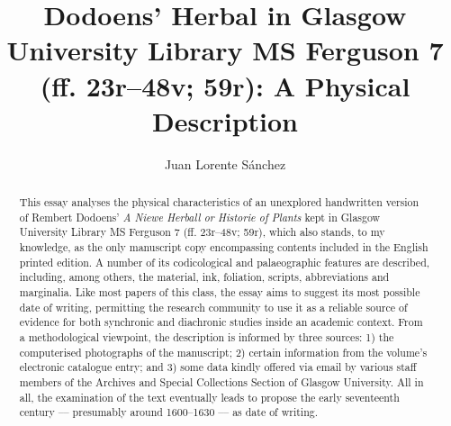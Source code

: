 \documentclass{article}
\author{Juan Lorente Sánchez}
\title{Dodoens' Herbal in Glasgow University Library MS Ferguson 7 (ff.
23r--48v; 59r): A Physical Description}
\begin{document}
\maketitle

\begin{abstract}
This essay analyses the physical characteristics of an unexplored handwritten version of Rembert Dodoens' \emph{A Niewe Herball or Historie of Plants} kept in Glasgow University Library MS Ferguson 7 (ff. 23r--48v; 59r), which also stands, to my knowledge, as the only manuscript copy encompassing contents included in the English printed edition. A number of its codicological and palaeographic features are described, including, among others, the material, ink, foliation, scripts, abbreviations and marginalia. Like most papers of this class, the essay aims to suggest its most possible date of writing, permitting the research community to use it as a reliable source of evidence for both synchronic and diachronic studies inside an academic context. From a methodological viewpoint, the description is informed by three sources: 1) the computerised photographs of the manuscript; 2) certain information from the volume's electronic catalogue entry; and 3) some data kindly offered via email by various staff members of the Archives and Special Collections Section of Glasgow University. All in all, the examination of the text eventually leads to propose the early seventeenth century –– presumably around 1600--1630 –– as date of writing.
\end{abstract}


\end{document}
